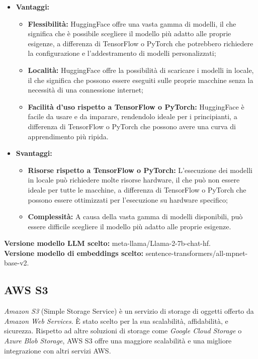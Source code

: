\documentclass[10pt, a4paper]{article}
\begin{document}
\begin{itemize}
\item \textbf{Vantaggi:}
\begin{itemize}
\item \textbf{Flessibilità:} HuggingFace offre una vasta gamma di modelli, il che significa che è possibile scegliere il modello più adatto alle proprie esigenze, a differenza di TensorFlow o PyTorch che potrebbero richiedere la configurazione e l'addestramento di modelli personalizzati;
\item \textbf{Località:} HuggingFace offre la possibilità di scaricare i modelli in locale, il che significa che possono essere eseguiti sulle proprie macchine senza la necessità di una connessione internet;
\item \textbf{Facilità d'uso rispetto a TensorFlow o PyTorch:} HuggingFace è facile da usare e da imparare, rendendolo ideale per i principianti, a differenza di TensorFlow o PyTorch che possono avere una curva di apprendimento più ripida.
\end{itemize}
\item \textbf{Svantaggi:}
\begin{itemize}
\item \textbf{Risorse rispetto a TensorFlow o PyTorch:} L'esecuzione dei modelli in locale può richiedere molte risorse hardware, il che può non essere ideale per tutte le macchine, a differenza di TensorFlow o PyTorch che possono essere ottimizzati per l'esecuzione su hardware specifico;
\item \textbf{Complessità:} A causa della vasta gamma di modelli disponibili, può essere difficile scegliere il modello più adatto alle proprie esigenze.
\end{itemize}
\end{itemize}
\textbf{Versione modello LLM scelto:} meta-llama/Llama-2-7b-chat-hf. \\
\textbf{Versione modello di embeddings scelto:} sentence-transformers/all-mpnet-base-v2.

\subsection{AWS S3}
\textit{Amazon S3\pg} (Simple Storage Service) è un servizio di storage di oggetti offerto da \textit{Amazon Web Services\pg}. È stato scelto per la sua scalabilità, affidabilità, e sicurezza. Rispetto ad altre soluzioni di storage come \textit{Google Cloud Storage\pg} o \textit{Azure Blob Storage\pg}, AWS S3 offre una maggiore scalabilità e una migliore integrazione con altri servizi AWS.
\end{document}
